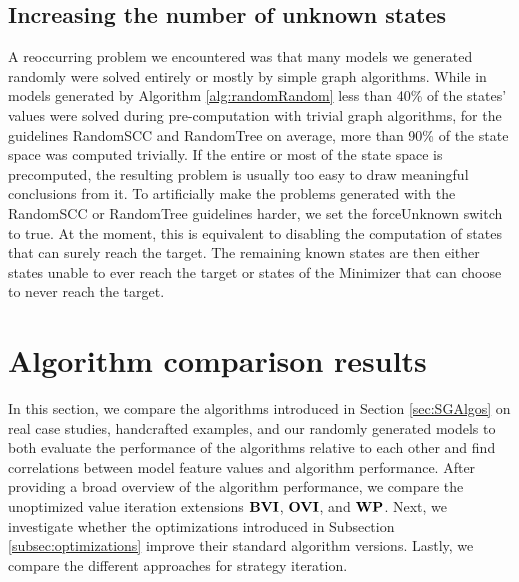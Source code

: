 \subsection{Increasing the number of unknown states}
A reoccurring problem we encountered was that many models we generated randomly were solved entirely or mostly by simple graph algorithms.
While in models generated by Algorithm \ref{alg:randomRandom} less than 40\% of the states' values were solved during pre-computation with trivial graph algorithms, 
for the guidelines RandomSCC and RandomTree on average, more than 90\% of the state space was computed trivially.
If the entire or most of the state space is precomputed, the resulting problem is usually too easy to draw meaningful conclusions from it.
To artificially make the problems generated with the RandomSCC or RandomTree guidelines harder, we set the forceUnknown switch to true. 
At the moment, this is equivalent to disabling the computation of 
states that can surely reach the target.
The remaining known states are then either states unable to ever reach the target or states of the Minimizer that can choose to never reach the target.

\section{Algorithm comparison results}
In this section, we compare the algorithms introduced in Section \ref{sec:SGAlgos} on real case studies, handcrafted examples, and our randomly generated models to both evaluate the 
performance of the algorithms relative to each other and find correlations between model feature values and algorithm performance.
After providing a broad overview of the algorithm performance, we compare the unoptimized value iteration extensions $\mathbf{BVI}$, $\mathbf{OVI}$, and $\mathbf{WP}$.
Next, we investigate whether the optimizations introduced in Subsection \ref{subsec:optimizations} improve their standard algorithm versions. Lastly, we compare the different approaches for strategy iteration. 

